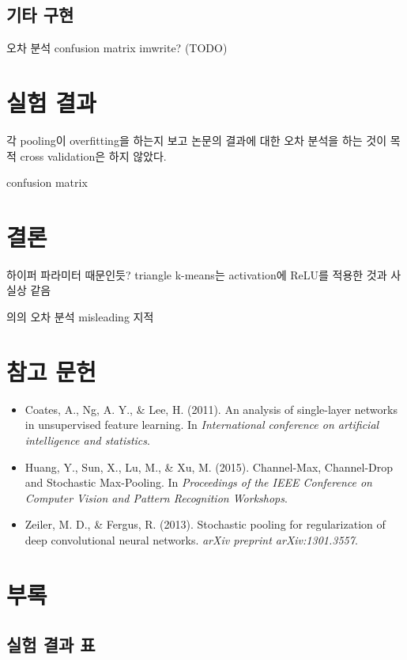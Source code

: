 \documentclass[a4paper,9pt]{article}
\begin{document}
\begin{multicols}{2}
\subsection{기타 구현}

오차 분석
confusion matrix
imwrite?
(TODO)

\section{실험 결과}

각 pooling이 overfitting을 하는지 보고 논문의 결과에 대한 오차 분석을 하는 것이 목적
cross validation은 하지 않았다.

confusion matrix

\section{결론}

하이퍼 파라미터 때문인듯?
triangle k-means는 activation에 ReLU를 적용한 것과 사실상 같음

의의
오차 분석
misleading 지적

\end{multicols}

\section*{참고 문헌}

\begin{itemize}
\item Coates, A., Ng, A. Y., \& Lee, H. (2011). An analysis of single-layer networks in unsupervised feature learning. In \textit{International conference on artificial intelligence and statistics}.
\item Huang, Y., Sun, X., Lu, M., \& Xu, M. (2015). Channel-Max, Channel-Drop and Stochastic Max-Pooling. In \textit{Proceedings of the IEEE Conference on Computer Vision and Pattern Recognition Workshops}.
\item Zeiler, M. D., \& Fergus, R. (2013). Stochastic pooling for regularization of deep convolutional neural networks. \textit{arXiv preprint arXiv:1301.3557}.
\end{itemize}

\section*{부록}

\subsection*{실험 결과 표}
\end{document}
